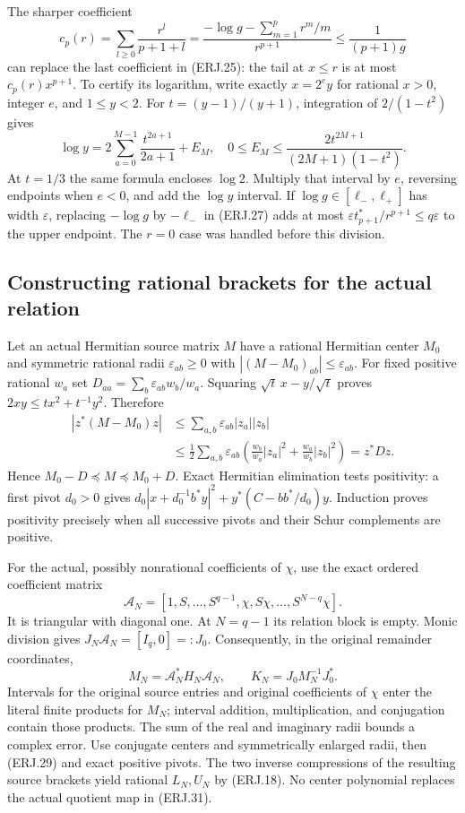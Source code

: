 The sharper coefficient
\[
 c_p(r)=\sum_{l\ge0}\frac{r^l}{p+1+l}
 =\frac{-\log g-\sum_{m=1}^pr^m/m}{r^{p+1}}
 \le\frac1{(p+1)g}\tag{ERJ.27}
\]
can replace the last coefficient in (ERJ.25): the tail at $x\le r$
is at most $c_p(r)x^{p+1}$. To certify its logarithm, write exactly
$x=2^e y$ for rational $x>0$, integer $e$, and $1\le y<2$.
For $t=(y-1)/(y+1)$, integration of $2/(1-t^2)$ gives
\[
 \log y=2\sum_{a=0}^{M-1}\frac{t^{2a+1}}{2a+1}+E_M,
 \quad0\le E_M\le
 \frac{2t^{2M+1}}{(2M+1)(1-t^2)}.\tag{ERJ.28}
\]
At $t=1/3$ the same formula encloses $\log2$. Multiply that
interval by $e$, reversing endpoints when $e<0$, and add the
$\log y$ interval. If $\log g\in[\ell_-,\ell_+]$ has width
$\varepsilon$, replacing $-\log g$ by $-\ell_-$ in (ERJ.27)
adds at most $\varepsilon t_{p+1}^*/r^{p+1}\le q\varepsilon$
to the upper endpoint. The $r=0$ case was handled before this division.

\subsection{Constructing rational brackets for the actual relation}
Let an actual Hermitian source matrix $M$ have a rational Hermitian
center $M_0$ and symmetric rational radii $\varepsilon_{ab}\ge0$
with $|(M-M_0)_{ab}|\le\varepsilon_{ab}$. For fixed positive
rational $w_a$ set $D_{aa}=\sum_b\varepsilon_{ab}w_b/w_a$.
Squaring $\sqrt t\,x-y/\sqrt t$ proves
$2xy\le tx^2+t^{-1}y^2$. Therefore
\[
\begin{split}
 |z^*(M-M_0)z|&\le\sum_{a,b}\varepsilon_{ab}|z_a||z_b|\\
 &\le\frac12\sum_{a,b}\varepsilon_{ab}
 \left(\frac{w_b}{w_a}|z_a|^2+\frac{w_a}{w_b}|z_b|^2\right)
 =z^*Dz.
\end{split}\tag{ERJ.29}
\]
Hence $M_0-D\preceq M\preceq M_0+D$. Exact Hermitian elimination
tests positivity: a first pivot $d_0>0$ gives
$d_0|x+d_0^{-1}b^*y|^2+y^*(C-bb^*/d_0)y$.
Induction proves positivity precisely when all successive pivots
and their Schur complements are positive.

For the actual, possibly nonrational coefficients of $\chi$, use the
exact ordered coefficient matrix
\[
 \mathcal A_N=[1,S,\ldots,S^{q-1},\chi,S\chi,\ldots,S^{N-q}\chi].
 \tag{ERJ.30}
\]
It is triangular with diagonal one. At $N=q-1$ its relation block
is empty. Monic division gives $J_N\mathcal A_N=[I_q,0]=:J_0$.
Consequently, in the original remainder coordinates,
\[
 M_N=\mathcal A_N^*H_N\mathcal A_N,\qquad
 K_N=J_0M_N^{-1}J_0^*.\tag{ERJ.31}
\]
Intervals for the original source entries and original coefficients
of $\chi$ enter the literal finite products for $M_N$; interval
addition, multiplication, and conjugation contain those products.
The sum of the real and imaginary radii bounds a complex error.
Use conjugate centers and symmetrically enlarged radii, then (ERJ.29)
and exact positive pivots. The two inverse compressions of the
resulting source brackets yield rational $L_N,U_N$ by (ERJ.18).
No center polynomial replaces the actual quotient map in (ERJ.31).

